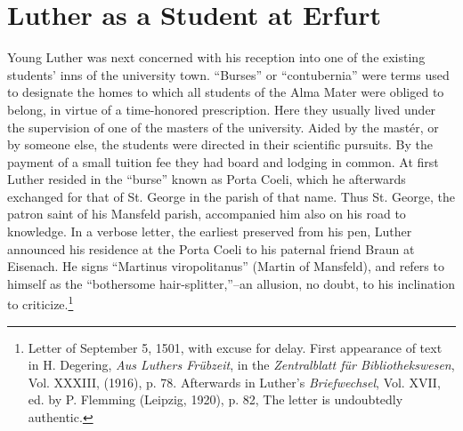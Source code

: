 \section{Luther as a Student at Erfurt}

Young Luther was next concerned with his reception into one of
the existing students’ inns of the university town. “Burses” or “contubernia”
were terms used to designate the homes to which all
students of the Alma Mater were obliged to belong, in virtue of
a time-honored prescription. Here they usually lived under the
supervision of one of the masters of the university. Aided by the
mastér, or by someone else, the students were directed in their scientific pursuits. By the payment of a small tuition fee they had board
and lodging in common. At first Luther resided in the “burse” known
as Porta Coeli, which he afterwards exchanged for that of St. George
in the parish of that name. Thus St. George, the patron saint of his
Mansfeld parish, accompanied him also on his road to knowledge.
In a verbose letter, the earliest preserved from his pen, Luther announced his residence at the Porta Coeli to his paternal friend Braun
at Eisenach. He signs “Martinus viropolitanus” (Martin of Mansfeld),
and refers to himself as the ``bothersome hair-splitter,''--an allusion,
no doubt, to his inclination to criticize.\footnote
{Letter of September 5, 1501, with excuse for delay. First appearance of text in
H. Degering, \textit{Aus Luthers Frübzeit}, in the \textit{Zentralblatt für Bibliothekswesen}, Vol. XXXIII,
(1916), p. 78. Afterwards in Luther’s \textit{Briefwechsel}, Vol. XVII, ed. by P. Flemming (Leipzig, 1920), p. 82, The letter is undoubtedly authentic.}

